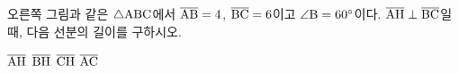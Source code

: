 \noindent\begin{minipage}[t]{0.58\linewidth}\vspace{0pt}\raggedright 오른쪽 그림과 같은 $\triangle\mathrm{ABC}$에서 $\overline{\mathrm{AB}}=4$, $\overline{\mathrm{BC}}=6$이고 $\angle\mathrm{B}=60^\circ$이다. $\overline{\mathrm{AH}}\perp\overline{\mathrm{BC}}$일 때, 다음 선분의 길이를 구하시오.\end{minipage}\hfill\begin{minipage}[t]{0.4\linewidth}\vspace{0pt}\centering \resizebox{\ifdim\width>\linewidth\linewidth\else\width\fi}{!}{}\end{minipage}\par
{} $\overline{\mathrm{AH}}$
 $\overline{\mathrm{BH}}$
 $\overline{\mathrm{CH}}$
 $\overline{\mathrm{AC}}$
